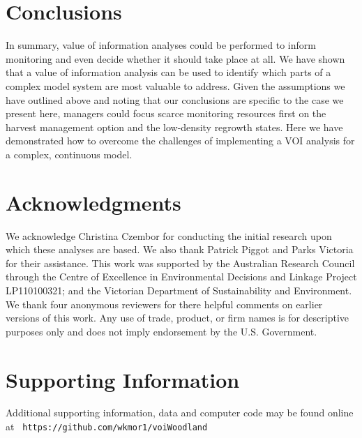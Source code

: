 \documentclass[draft]{article}
\theoremstyle{definition}
\theoremstyle{definition}
\theoremstyle{definition}
\theoremstyle{remark}
\begin{document}
\section*{Conclusions}\label{conclusions}

In summary, value of information analyses could be performed to inform
monitoring and even decide whether it should take place at all. We have
shown that a value of information analysis can be used to identify which
parts of a complex model system are most valuable to address. Given the
assumptions we have outlined above and noting that our conclusions are
specific to the case we present here, managers could focus scarce
monitoring resources first on the harvest management option and the
low-density regrowth states. Here we have demonstrated how to overcome
the challenges of implementing a VOI analysis for a complex, continuous
model.

\section*{Acknowledgments}\label{acknowledgments}

We acknowledge Christina Czembor for conducting the initial research
upon which these analyses are based. We also thank Patrick Piggot and
Parks Victoria for their assistance. This work was supported by the
Australian Research Council through the Centre of Excellence in
Environmental Decisions and Linkage Project LP110100321; and the
Victorian Department of Sustainability and Environment. We thank four
anonymous reviewers for there helpful comments on earlier versions of
this work. Any use of trade, product, or firm names is for descriptive
purposes only and does not imply endorsement by the U.S. Government.

\section*{Supporting Information}\label{supporting-information}

Additional supporting information, data and computer code may be found
online at \newline\texttt{ https://github.com/wkmor1/voiWoodland}


\end{document}
